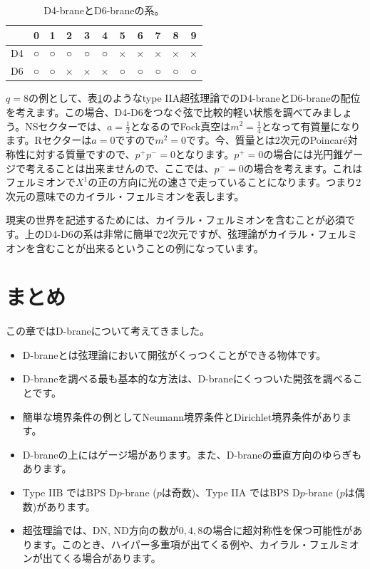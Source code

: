 \documentclass[report,paper=a4, fontsize=12pt, line_length=16cm, number_of_lines=34,dvipdfmx]{jlreq}
\numberwithin{equation}{chapter}
\numberwithin{equation}{section}
\begin{document}
\begin{table}[htbp]
  \centering
  \begin{tabular}{|c||c|c|c|c|c|c|c|c|c|c|}\hline
    &0 &1 &2 &3 &4 &5 &6 &7 &8 &9 \\ \hline\hline
  D4&○&○&○&○&○&×&×&×&×&×\\ \hline    
  D6&○&○&×&×&×&○&○&○&○&○\\ \hline    
  \end{tabular}
  \caption{D4-braneとD6-braneの系。}
  \label{tab:D4D6}
\end{table}
$q=8$の例として、表\ref{tab:D4D6}のようなtype IIA超弦理論でのD4-braneとD6-braneの配位を考えます。この場合、D4-D6をつなぐ弦で比較的軽い状態を調べてみましょう。NSセクターでは、$a=\frac12$となるのでFock真空は$m^2=\frac14$となって有質量になります。Rセクターは$a=0$ですので$m^2=0$です。今、質量とは2次元のPoincar\'e対称性に対する質量ですので、$p^{+}p^{-}=0$となります。$p^{+}=0$の場合には光円錐ゲージで考えることは出来ませんので、ここでは、$p^{-}=0$の場合を考えます。これはフェルミオンで$X^{1}$の正の方向に光の速さで走っていることになります。つまり2次元の意味でのカイラル・フェルミオンを表します。

現実の世界を記述するためには、カイラル・フェルミオンを含むことが必須です。上のD4-D6の系は非常に簡単で2次元ですが、弦理論がカイラル・フェルミオンを含むことが出来るということの例になっています。

\section{まとめ}
この章ではD-braneについて考えてきました。
\begin{itemize}
  \item D-braneとは弦理論において開弦がくっつくことができる物体です。
  \item D-braneを調べる最も基本的な方法は、D-braneにくっついた開弦を調べることです。
  \item 簡単な境界条件の例としてNeumann境界条件とDirichlet境界条件があります。
  \item D-braneの上にはゲージ場があります。また、D-braneの垂直方向のゆらぎもあります。
  \item Type IIB ではBPS D$p$-brane ($p$は奇数)、Type IIA ではBPS D$p$-brane ($p$は偶数)があります。
  \item 超弦理論では、DN, ND方向の数が$0,4,8$の場合に超対称性を保つ可能性があります。このとき、ハイパー多重項が出てくる例や、カイラル・フェルミオンが出てくる場合があります。
\end{itemize}
\end{document}
